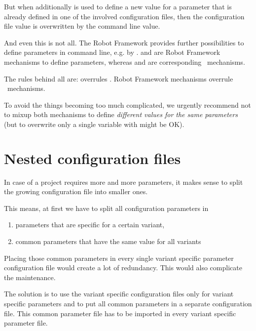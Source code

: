 But when additionally  is used to define a new value for a parameter that is already defined in one of the involved configuration files,
then the configuration file value is overwritten by the command line value.

\vspace{2ex}

And even this is not all. The Robot Framework provides further possibilities to define parameters in command line, e.g. by
.  and  are Robot Framework mechanisms to define parameters, whereas
 and  are corresponding \pkg\ mechanisms.

The rules behind all are:  overrules . Robot Framework mechanisms overrule \pkg\ mechanisms.

To avoid the things becoming too much complicated, we urgently recommend not to mixup both mechanisms to define \textit{different values for the same parameters}
(but to overwrite only a single variable with  might be OK).


\newpage

\section{Nested configuration files}

In case of a project requires more and more parameters, it makes sense to split the growing configuration file into smaller ones.

This means, at first we have to split all configuration parameters in
\begin{enumerate}
   \item parameters that are specific for a certain variant,
   \item common parameters that have the same value for all variants
\end{enumerate}

Placing those common parameters in every single variant specific parameter configuration file would create a lot of redundancy.
This would also complicate the maintenance.

The solution is to use the variant specific configuration files only for variant specific parameters and to put all common parameters in
a separate configuration file. This common parameter file has to be imported in every variant specific parameter file.

